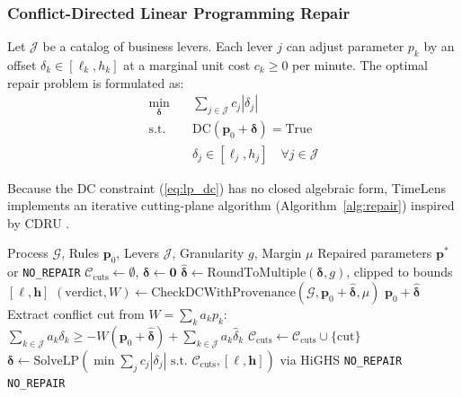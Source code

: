 \documentclass[conference]{IEEEtran}
\begin{document}
\subsubsection{Conflict-Directed Linear Programming Repair}
Let $\mathcal{J}$ be a catalog of business levers. Each lever $j$ can adjust parameter $p_k$ by an offset $\delta_k \in [\ell_k, h_k]$ at a marginal unit cost $c_k \geq 0$ per minute. The optimal repair problem is formulated as:
\begin{align}
\min_{\boldsymbol{\delta}} \quad & \sum_{j \in \mathcal{J}} c_j |\delta_j| \label{eq:lp_obj} \\
\text{s.t.} \quad & \text{DC}(\mathbf{p}_0 + \boldsymbol{\delta}) = \text{True} \label{eq:lp_dc} \\
& \delta_j \in [\ell_j, h_j] \quad \forall j \in \mathcal{J} \label{eq:lp_bounds}
\end{align}

Because the DC constraint (\ref{eq:lp_dc}) has no closed algebraic form, TimeLens implements an iterative cutting-plane algorithm (Algorithm~\ref{alg:repair}) inspired by CDRU \cite{yu2014}.

\begin{algorithm}[h]
\caption{Conflict-Directed Cost-Optimal Model Repair}
\label{alg:repair}
\begin{algorithmic}[1]
\REQUIRE Process $\mathcal{G}$, Rules $\mathbf{p}_0$, Levers $\mathcal{J}$, Granularity $g$, Margin $\mu$
\ENSURE Repaired parameters $\mathbf{p}^*$ or \texttt{NO\_REPAIR}
\STATE $\mathcal{C}_{\text{cuts}} \leftarrow \emptyset$, $\boldsymbol{\delta} \leftarrow \mathbf{0}$
    \STATE $\hat{\boldsymbol{\delta}} \leftarrow \text{RoundToMultiple}(\boldsymbol{\delta}, g)$, clipped to bounds $[\boldsymbol{\ell}, \mathbf{h}]$
    \STATE $(\text{verdict}, W) \leftarrow \text{CheckDCWithProvenance}(\mathcal{G}, \mathbf{p}_0 + \hat{\boldsymbol{\delta}}, \mu)$
        \RETURN $\mathbf{p}_0 + \hat{\boldsymbol{\delta}}$ 
    \ENDIF
    \STATE Extract conflict cut from $W = \sum_k a_k p_k$:
    \STATE \quad $\sum_{k \in \mathcal{J}} a_k \delta_k \geq -W(\mathbf{p}_0 + \hat{\boldsymbol{\delta}}) + \sum_{k \in \mathcal{J}} a_k \hat{\delta}_k$
    \STATE $\mathcal{C}_{\text{cuts}} \leftarrow \mathcal{C}_{\text{cuts}} \cup \{\text{cut}\}$
    \STATE $\boldsymbol{\delta} \leftarrow \text{SolveLP}(\min \sum_j c_j |\delta_j| \text{ s.t. } \mathcal{C}_{\text{cuts}}, [\boldsymbol{\ell}, \mathbf{h}])$ via HiGHS
        \RETURN \texttt{NO\_REPAIR} 
    \ENDIF
\ENDFOR
\RETURN \texttt{NO\_REPAIR}
\end{algorithmic}
\end{algorithm}
\end{document}
